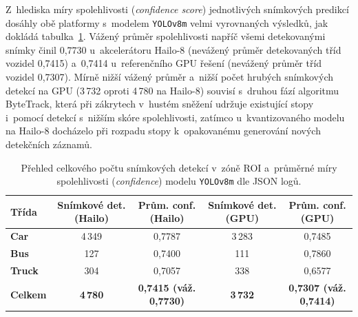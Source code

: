 Z~hlediska míry spolehlivosti (\textit{confidence score}) jednotlivých snímkových predikcí dosáhly obě platformy s~modelem \texttt{YOLOv8m} velmi vyrovnaných výsledků, jak dokládá tabulka~\ref{tab:confidence_stats}. Vážený průměr spolehlivosti napříč všemi detekovanými snímky činil 0,7730 u~akcelerátoru Hailo-8 (nevážený průměr detekovaných tříd vozidel 0,7415) a~0,7414 u~referenčního GPU řešení (nevážený průměr tříd vozidel 0,7307). Mírně nižší vážený průměr a~nižší počet hrubých snímkových detekcí na GPU (3\,732 oproti 4\,780 na Hailo-8) souvisí s~druhou fází algoritmu ByteTrack, která při zákrytech v~hustém sněžení udržuje existující stopy i~pomocí detekcí s~nižším skóre spolehlivosti, zatímco u~kvantizovaného modelu na Hailo-8 docházelo při rozpadu stopy k~opakovanému generování nových detekčních záznamů. %

\begin{table}[H]
    \centering
    \small\renewcommand{\arraystretch}{1.2}
    \setlength{\tabcolsep}{3pt}
    \begin{tabular}{|l|c|c|c|c|}
        \hline
        \textbf{Třída} & \textbf{Snímkové det. (Hailo)} & \textbf{Prům. conf. (Hailo)} & \textbf{Snímkové det. (GPU)} & \textbf{Prům. conf. (GPU)} \\ \hline
        \textbf{Car} & 4\,349 & 0,7787 & 3\,283 & 0,7485 \\ \hline
        \textbf{Bus} & 127 & 0,7400 & 111 & 0,7860 \\ \hline
        \textbf{Truck} & 304 & 0,7057 & 338 & 0,6577 \\ \hline \hline
        \textbf{Celkem} & \textbf{4\,780} & \textbf{0,7415 (váž. 0,7730)} & \textbf{3\,732} & \textbf{0,7307 (váž. 0,7414)} \\ \hline
    \end{tabular}
    \caption{Přehled celkového počtu snímkových detekcí v~zóně ROI a~průměrné míry spolehlivosti (\textit{confidence}) modelu \texttt{YOLOv8m} dle \acs{JSON} logů.}
    \label{tab:confidence_stats}
\end{table}

